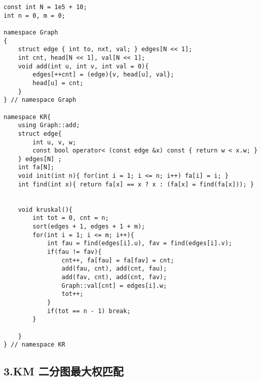 \documentclass[]{article}
\begin{document}
\begin{verbatim}
const int N = 1e5 + 10;
int n = 0, m = 0;

namespace Graph
{
    struct edge { int to, nxt, val; } edges[N << 1];
    int cnt, head[N << 1], val[N << 1];
    void add(int u, int v, int val = 0){
        edges[++cnt] = (edge){v, head[u], val};
        head[u] = cnt;
    }
} // namespace Graph

namespace KR{
    using Graph::add;
    struct edge{ 
        int u, v, w;
        const bool operator< (const edge &x) const { return w < x.w; }
    } edges[N] ;
    int fa[N];
    void init(int n){ for(int i = 1; i <= n; i++) fa[i] = i; }
    int find(int x){ return fa[x] == x ? x : (fa[x] = find(fa[x])); }

    
    void kruskal(){
        int tot = 0, cnt = n;
        sort(edges + 1, edges + 1 + m);
        for(int i = 1; i <= m; i++){
            int fau = find(edges[i].u), fav = find(edges[i].v);
            if(fau != fav){
                cnt++, fa[fau] = fa[fav] = cnt;
                add(fau, cnt), add(cnt, fau);
                add(fav, cnt), add(cnt, fav);
                Graph::val[cnt] = edges[i].w;
                tot++;
            }
            if(tot == n - 1) break;
        }

    }
} // namespace KR
\end{verbatim}

\hypertarget{km-ux4e8cux5206ux56feux6700ux5927ux6743ux5339ux914d}{%
\subsection{3.KM
二分图最大权匹配}\label{km-ux4e8cux5206ux56feux6700ux5927ux6743ux5339ux914d}}
\end{document}

